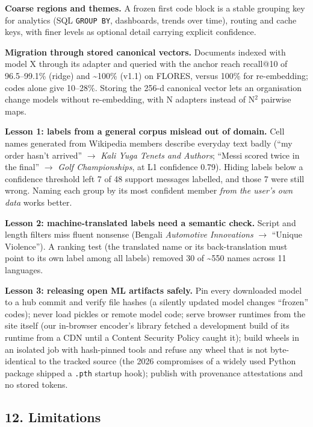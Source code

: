 \documentclass[
  10pt,
]{article}
\begin{document}
\textbf{Coarse regions and themes.} A frozen first code block is a
stable grouping key for analytics (SQL \texttt{GROUP\ BY}, dashboards,
trends over time), routing and cache keys, with finer levels as optional
detail carrying explicit confidence.

\textbf{Migration through stored canonical vectors.} Documents indexed
with model X through its adapter and queried with the anchor reach
recall@10 of 96.5--99.1\% (ridge) and \textasciitilde100\% (v1.1) on
FLORES, versus 100\% for re-embedding; codes alone give 10--28\%.
Storing the 256-d canonical vector lets an organisation change models
without re-embedding, with N adapters instead of N$^2$ pairwise maps.

\textbf{Lesson 1: labels from a general corpus mislead out of domain.}
Cell names generated from Wikipedia members describe everyday text badly
(``my order hasn't arrived'' $\rightarrow$ \emph{Kali Yuga Tenets and Authors};
``Messi scored twice in the final'' $\rightarrow$ \emph{Golf Championships}, at L1
confidence 0.79). Hiding labels below a confidence threshold left 7 of
48 support messages labelled, and those 7 were still wrong. Naming each
group by its most confident member \emph{from the user's own data} works
better.

\textbf{Lesson 2: machine-translated labels need a semantic check.}
Script and length filters miss fluent nonsense (Bengali \emph{Automotive
Innovations} $\rightarrow$ ``Unique Violence''). A ranking test (the translated name
or its back-translation must point to its own label among all labels)
removed 30 of \textasciitilde550 names across 11 languages.

\textbf{Lesson 3: releasing open ML artifacts safely.} Pin every
downloaded model to a hub commit and verify file hashes (a silently
updated model changes ``frozen'' codes); never load pickles or remote
model code; serve browser runtimes from the site itself (our in-browser
encoder's library fetched a development build of its runtime from a CDN
until a Content Security Policy caught it); build wheels in an isolated
job with hash-pinned tools and refuse any wheel that is not
byte-identical to the tracked source (the 2026 compromises of a widely
used Python package shipped a \texttt{.pth} startup hook); publish with
provenance attestations and no stored tokens.

\hypertarget{limitations}{%
\subsection{12. Limitations}\label{limitations}}
\end{document}
